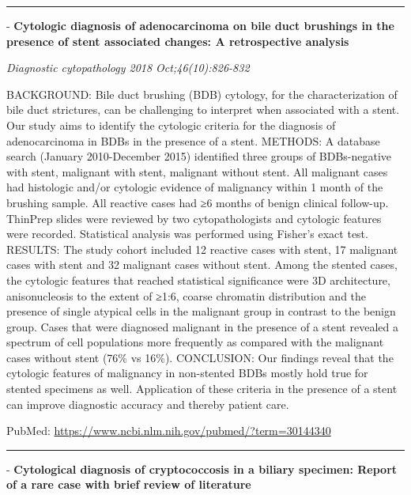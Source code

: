 \documentclass[]{article}
\begin{document}
\begin{center}\rule{0.5\linewidth}{\linethickness}\end{center}

 - \textbf{Cytologic diagnosis of adenocarcinoma on bile duct brushings
in the presence of stent associated changes: A retrospective analysis}

\emph{Diagnostic cytopathology 2018 Oct;46(10):826-832}

BACKGROUND: Bile duct brushing (BDB) cytology, for the characterization
of bile duct strictures, can be challenging to interpret when associated
with a stent. Our study aims to identify the cytologic criteria for the
diagnosis of adenocarcinoma in BDBs in the presence of a stent. METHODS:
A database search (January 2010-December 2015) identified three groups
of BDBs-negative with stent, malignant with stent, malignant without
stent. All malignant cases had histologic and/or cytologic evidence of
malignancy within 1 month of the brushing sample. All reactive cases had
≥6 months of benign clinical follow-up. ThinPrep slides were reviewed by
two cytopathologists and cytologic features were recorded. Statistical
analysis was performed using Fisher's exact test. RESULTS: The study
cohort included 12 reactive cases with stent, 17 malignant cases with
stent and 32 malignant cases without stent. Among the stented cases, the
cytologic features that reached statistical significance were 3D
architecture, anisonucleosis to the extent of ≥1:6, coarse chromatin
distribution and the presence of single atypical cells in the malignant
group in contrast to the benign group. Cases that were diagnosed
malignant in the presence of a stent revealed a spectrum of cell
populations more frequently as compared with the malignant cases without
stent (76\% vs 16\%). CONCLUSION: Our findings reveal that the cytologic
features of malignancy in non-stented BDBs mostly hold true for stented
specimens as well. Application of these criteria in the presence of a
stent can improve diagnostic accuracy and thereby patient care.

PubMed: \url{https://www.ncbi.nlm.nih.gov/pubmed/?term=30144340}

{}

{}

\begin{center}\rule{0.5\linewidth}{\linethickness}\end{center}

 - \textbf{Cytological diagnosis of cryptococcosis in a biliary
specimen: Report of a rare case with brief review of literature}
\end{document}
